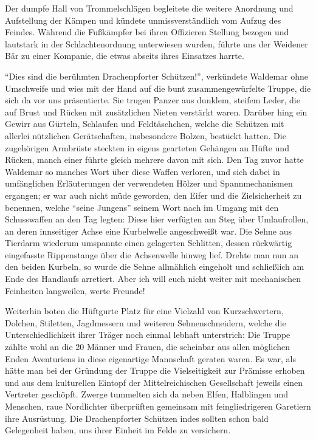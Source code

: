 Der dumpfe Hall von Trommelschlägen begleitete die weitere Anordnung und Aufstellung der Kämpen und kündete unmissverständlich vom Aufzug des Feindes. Während die Fußkämpfer bei ihren Offizieren Stellung bezogen und lautstark in der Schlachtenordnung unterwiesen wurden, führte uns der Weidener Bär zu einer Kompanie, die etwas abseits ihres Einsatzes harrte.

``Dies sind die berühmten Drachenpforter Schützen!'', verkündete Waldemar ohne Umschweife und wies mit der Hand auf die bunt zusammengewürfelte Truppe, die sich da vor uns präsentierte. Sie trugen Panzer aus dunklem, steifem Leder, die auf Brust und Rücken mit zusätzlichen Nieten verstärkt waren. Darüber hing ein Gewirr aus Gürteln, Schlaufen und Feldtäschchen, welche die Schützen mit allerlei nützlichen Gerätschaften, insbesondere Bolzen, bestückt hatten. Die zugehörigen Armbrüste steckten in eigens gearteten Gehängen an Hüfte und Rücken, manch einer führte gleich mehrere davon mit sich. Den Tag zuvor hatte Waldemar so manches Wort über diese Waffen verloren, und sich dabei in umfänglichen Erläuterungen der verwendeten Hölzer und Spannmechanismen ergangen; er war auch nicht müde geworden, den Eifer und die Zielsicherheit zu benennen, welche ``seine Jungens'' seinem Wort nach im Umgang mit den Schusswaffen an den Tag legten: Diese hier verfügten am Steg über Umlaufrollen, an deren innseitiger Achse eine Kurbelwelle angeschweißt war. Die Sehne aus Tierdarm wiederum umspannte einen gelagerten Schlitten, dessen rückwärtig eingefasste Rippenstange über die Achsenwelle hinweg lief. Drehte man nun an den beiden Kurbeln, so wurde die Sehne allmählich eingeholt und schließlich am Ende des Handlaufs arretiert. Aber ich will euch nicht weiter mit mechanischen Feinheiten langweilen, werte Freunde!

Weiterhin boten die Hüftgurte Platz für eine Vielzahl von Kurzschwertern, Dolchen, Stiletten, Jagdmessern und weiteren Sehnenschneidern, welche die Unterschiedlichkeit ihrer Träger noch einmal lebhaft unterstrich: Die Truppe zählte wohl an die 20 Männer und Frauen, die scheinbar aus allen möglichen Enden Aventuriens in diese eigenartige Mannschaft geraten waren. Es war, als hätte man bei der Gründung der Truppe die Vielseitigkeit zur Prämisse erhoben und aus dem kulturellen Eintopf der Mittelreichischen Gesellschaft jeweils einen Vertreter geschöpft. Zwerge tummelten sich da neben Elfen, Halblingen und Menschen, raue Nordlichter überprüften gemeinsam mit feingliedrigeren Garetiern ihre Ausrüstung. Die Drachenpforter Schützen indes sollten schon bald Gelegenheit haben, uns ihrer Einheit im Felde zu versichern.

